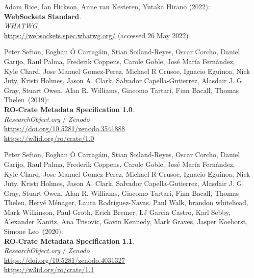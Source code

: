 \begin{thebibliography}{9}
Adam Rice, Ian Hickson, Anne van Kesteren, Yutaka Hirano (2022):\\
\textbf{WebSockets Standard}. \\
\emph{WHATWG}\\
\url{https://websockets.spec.whatwg.org/}
(accessed 26 May 2022)

Peter Sefton, Eoghan Ó Carragáin, Stian Soiland-Reyes, Oscar
Corcho, Daniel Garijo, Raul Palma, Frederik Coppens, Carole Goble, José
María Fernández, Kyle Chard, Jose Manuel Gomez-Perez, Michael R Crusoe,
Ignacio Eguinoa, Nick Juty, Kristi Holmes, Jason A. Clark, Salvador
Capella-Gutierrez, Alasdair J. G. Gray, Stuart Owen, Alan R. Williams,
Giacomo Tartari, Finn Bacall, Thomas Thelen~(2019):\\
\textbf{RO-Crate Metadata Specification 1.0}.\\
\emph{ResearchObject.org} / \emph{Zenodo}\\
\url{https://doi.org/10.5281/zenodo.3541888}\\
\url{https://w3id.org/ro/crate/1.0}

Peter Sefton, Eoghan Ó Carragáin, Stian Soiland-Reyes, Oscar
Corcho, Daniel Garijo, Raul Palma, Frederik Coppens, Carole Goble, José
María Fernández, Kyle Chard, Jose Manuel Gomez-Perez, Michael R Crusoe,
Ignacio Eguinoa, Nick Juty, Kristi Holmes, Jason A. Clark, Salvador
Capella-Gutierrez, Alasdair J. G. Gray, Stuart Owen, Alan R. Williams,
Giacomo Tartari, Finn Bacall, Thomas Thelen, Hervé Ménager, Laura
Rodríguez-Navas, Paul Walk, brandon whitehead, Mark Wilkinson, Paul
Groth, Erich Bremer, LJ Garcia Castro, Karl Sebby, Alexander Kanitz, Ana
Trisovic, Gavin Kennedy, Mark Graves, Jasper Koehorst, Simone Leo~(2020):\\
\textbf{RO-Crate Metadata Specification 1.1}.\\
\emph{ResearchObject.org} / \emph{Zenodo}\\
\url{https://doi.org/10.5281/zenodo.4031327}\\
\url{https://w3id.org/ro/crate/1.1}


\end{thebibliography}
